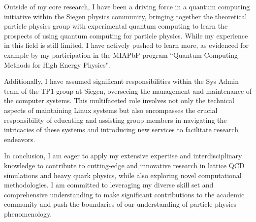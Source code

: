 \documentclass[11pt, a4paper]{awesome-cv}
\begin{document}
\begin{cvletter}
Outside of my core research, I have been a driving force in a quantum computing initiative within the Siegen physics community, bringing together the theoretical particle physics group with experimental quantum computing to learn the prospects of using quantum computing for particle physics. 
While my experience in this field is still limited, I have actively pushed to learn more, as evidenced for example by my participation in the MIAPbP program ``Quantum Computing Methods for High Energy Physics".

Additionally, I have assumed significant responsibilities within the Sys Admin team of the TP1 group at Siegen, overseeing the management and maintenance of the computer systems. 
This multifaceted role involves not only the technical aspects of maintaining Linux systems but also encompasses the crucial responsibility of educating and assisting group members in navigating the intricacies of these systems and introducing new services to facilitate research endeavors.

\pagebreak
In conclusion, I am eager to apply my extensive expertise and interdisciplinary knowledge to contribute to cutting-edge and innovative research in lattice QCD simulations and heavy quark physics, while also exploring novel computational methodologies. 
I am committed to leveraging my diverse skill set and comprehensive understanding to make significant contributions to the academic community and push the boundaries of our understanding of particle physics phenomenology.

\end{cvletter}

\makeletterclosing
\end{document}

